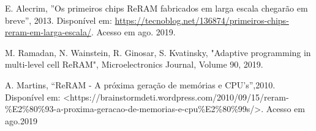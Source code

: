 \documentclass{ceel}
\begin{document}
\begin{multicols}{2}
\begin{thebibliography}{9}
   E. Alecrim, ”Os primeiros chips ReRAM fabricados em larga escala chegarão em breve”, 2013. Disponível em: \url{https://tecnoblog.net/136874/primeiros-chips-reram-em-larga-escala/}. Acesso em ago. 2019.
   
    M. Ramadan, N. Wainstein, R. Ginosar, S. Kvatinsky, "Adaptive programming in multi-level cell ReRAM", Microelectronics Journal, Volume 90, 2019. %
    
A. Martins, “ReRAM - A próxima geração de memórias e CPU’s”,2010. Disponível em: <https://brainstormdeti.wordpress.com/2010/09/15/reram-\%E2\%80\%93-a-proxima-geracao-de-memorias-e-cpu\%E2\%80\%99s/>. Acesso em ago.2019



\end{thebibliography}



\end{multicols}
\end{document}

